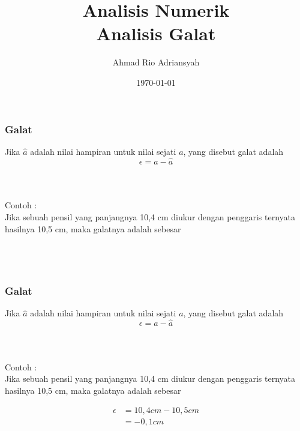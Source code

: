 \documentclass{beamer}
\title[Anum - Galat]{Analisis Numerik\\Analisis Galat} %
\author{Ahmad Rio Adriansyah} %
\institute[STT-NF] %
{
STT Terpadu - Nurul Fikri \\ %
\medskip
\textit{ahmad.rio.adriansyah@gmail.com
\\arasy@nurulfikri.ac.id} %
}
\date{\today} %
\begin{document}
\begin{frame}
\titlepage %
\end{frame}



\begin{frame}
\frametitle{Galat}
Jika $\hat{a}$ adalah nilai hampiran untuk nilai sejati $a$, yang disebut galat adalah 
\begin{equation}
\epsilon = a-\hat{a}
\nonumber
\end{equation} 
\\\ \\\ \\Contoh : \\Jika sebuah pensil yang panjangnya 10,4 cm diukur dengan penggaris ternyata hasilnya 10,5 cm, maka galatnya adalah sebesar 
\\\ \\\  \\\
\end{frame}


\begin{frame}
\frametitle{Galat}
Jika $\hat{a}$ adalah nilai hampiran untuk nilai sejati $a$, yang disebut galat adalah 
\begin{equation}
\epsilon = a-\hat{a}
\nonumber
\end{equation} 
\\\ \\\ \\Contoh : \\Jika sebuah pensil yang panjangnya 10,4 cm diukur dengan penggaris ternyata hasilnya 10,5 cm, maka galatnya adalah sebesar 

\begin{equation}
\begin{split}
\epsilon &= 10,4 cm - 10,5 cm
\\&= -0,1 cm
\end{split}
\nonumber
\end{equation}
\end{frame}

\end{document}
